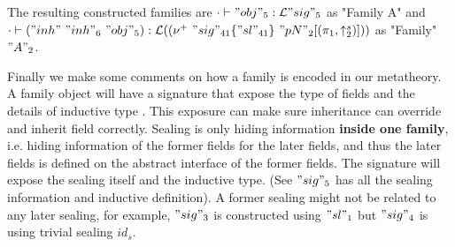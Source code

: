 The resulting constructed families are
${ {\cdot} \vdash {"obj"_5} : {{\mathcal{L}}"sig"_5} }$ as "Family A" and \\
${ {\cdot} \vdash {("inh"~"inh"_6~"obj"_5)} : {{\mathcal{L}}((\nu^+ \ "sig"_{41}
\{"sl"_{41}\} \ "pN"_2[(\pi_1, \uparrow^s_2)]))} }$ as "Family" $"A"_2$.

Finally we make some comments on how a family is encoded in our
metatheory. A family object will have a signature that expose the type
of fields and the details of inductive type . This exposure can make
sure inheritance can override and inherit field correctly. Sealing is
only hiding information \textbf{inside one family}, i.e. hiding
information of the former fields for the later fields, and thus the
later fields is defined on the abstract interface of the former fields.
The signature will expose the sealing itself and the inductive type.
(See $"sig"_5$ has all the sealing information and inductive
definition). A former sealing might not be related to any later sealing,
for example, $"sig"_3$ is constructed using $"sl"_1$ but $"sig"_4$ is
using trivial sealing $id_s$.